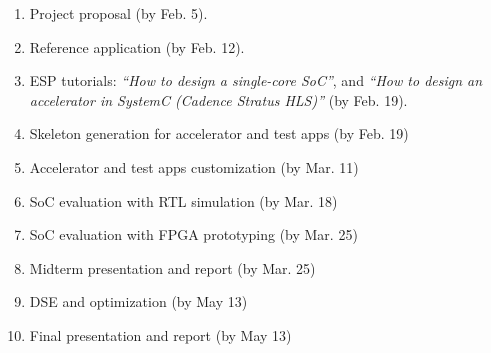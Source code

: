 \begin{enumerate}

\item Project proposal (by Feb. 5).
  
\item Reference application (by Feb. 12).

\item ESP tutorials: \emph{``How to design a single-core SoC''}, and \emph{``How
  to design an accelerator in SystemC (Cadence Stratus HLS)''} (by Feb. 19).

\item Skeleton generation for accelerator and test apps (by Feb. 19)
  
\item Accelerator and test apps customization (by Mar. 11)

\item SoC evaluation with RTL simulation (by Mar. 18)

\item SoC evaluation with FPGA prototyping (by Mar. 25)
  
\item Midterm presentation and report (by Mar. 25)
 
\item DSE and optimization (by May 13)

\item Final presentation and report (by May 13)

\end{enumerate}
